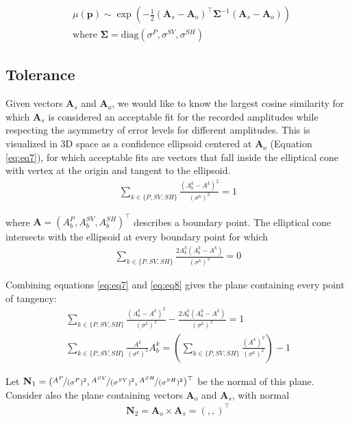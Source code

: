 \documentclass[preprint]{seismica}
\begin{document}
     \begin{align} \label{eq:eq6}
         &\mu(\mathbf{p}) \sim \exp \left( - \frac{1}{2} (\mathbf{A}_s - \mathbf{A}_o)^\top \mathbf{\Sigma}^{-1} (\mathbf{A}_s - \mathbf{A}_o) \right)\\
         \nonumber &\text{where } \mathbf{\Sigma} = \text{diag}(\sigma^P, \sigma^{SV}, \sigma^{SH})
     \end{align}

     \subsection{Tolerance}
     Given vectors $\mathbf{A}_s$ and $\mathbf{A}_o$, we would like to know the largest cosine similarity for which $\mathbf{A}_s$ is considered an acceptable fit for the recorded amplitudes while respecting the asymmetry of error levels for different amplitudes. This is visualized in 3D space as a confidence ellipsoid centered at $\mathbf{A}_o$ (Equation \ref{eq:eq7}), for which acceptable fits are vectors that fall inside the elliptical cone with vertex at the origin and tangent to the ellipsoid.
     \begin{align} \label{eq:eq7}
         \sum_{k \in \{P, SV, SH\}} \frac{(A^k_b-A^k)^2}{(\sigma^k)^2} = 1
     \end{align}
     
     where $\mathbf{A} = (A^P_b, A^{SV}_b, A^{SH}_b)^\top$ describes a boundary point. The elliptical cone intersects with the ellipsoid at every boundary point for which
     \begin{align} \label{eq:eq8}
         \sum_{k \in \{P, SV, SH\}} \frac{2A^k_b(A^k_b-A^k)}{(\sigma^k)^2} = 0
     \end{align}
     
     Combining equations \ref{eq:eq7} and \ref{eq:eq8} gives the plane containing every point of tangency:
     \begin{align} \label{eq:eq9}
         \sum_{k \in \{P, SV, SH\}} \frac{(A^k_b-A^k)^2}{(\sigma^k)^2} - \frac{2A^k_b(A^k_b-A^k)}{(\sigma^k)^2} = 1\\
         \nonumber \sum_{k \in \{P, SV, SH\}} \frac{A^k}{(\sigma^k)^2} A^k_b = \left( \sum_{k \in \{P, SV, SH\}} \frac{(A^k)^2}{(\sigma^k)^2} \right) -1
     \end{align}

     Let $\mathbf{N}_1 = (\nicefrac{A^P}{(\sigma^P)^2}, \nicefrac{A^{SV}}{(\sigma^{SV})^2}, \nicefrac{A^{SH}}{(\sigma^{SH})^2})^\top$ be the normal of this plane. Consider also the plane containing vectors $\mathbf{A}_o$ and $\mathbf{A}_s$, with normal
     \begin{align} \label{eq:eq10}
         \mathbf{N}_2 = \mathbf{A}_o \times \mathbf{A}_s = (,,)^\top
     \end{align}
\end{document}
